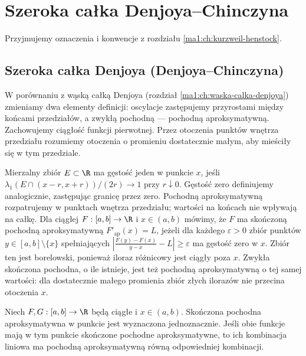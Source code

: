 \chapter{Szeroka całka Denjoya--Chinczyna}
\providecommand{\atlasref}[2]{#2}
\label{ma1:ch:szeroka-calka-denjoya}
\begingroup
\providecommand{\osc}{\operatorname{osc}}
\providecommand{\Var}{\operatorname{Var}}
\providecommand{\mesh}{\operatorname{mesh}}
\providecommand{\supp}{\operatorname{supp}}
\providecommand{\AC}{\mathrm{AC}}
\providecommand{\BV}{\mathrm{BV}}
\providecommand{\HK}{\mathrm{KH}}
\providecommand{\ind}[1]{\chi_{#1}}
\providecommand{\Dn}{\underline D}
\providecommand{\Du}{\overline D}
\providecommand{\KS}{\mathrm{KS}}
Przyjmujemy oznaczenia i konwencje z rozdziału \ref{ma1:ch:kurzweil-henstock}.
\section{Szeroka całka Denjoya (Denjoya--Chinczyna)}
W porównaniu z wąską całką Denjoya (rozdział
\ref{ma1:ch:waska-calka-denjoya}) zmieniamy dwa elementy
definicji: oscylacje zastępujemy przyrostami między
końcami przedziałów, a zwykłą pochodną --- pochodną
aproksymatywną. Zachowujemy ciągłość funkcji pierwotnej.
Przez otoczenia punktów wnętrza przedziału rozumiemy
otoczenia o promieniu dostatecznie małym, aby mieściły
się w tym przedziale.
\begin{definicja}\label{it:def:approx-derivative}
Mierzalny zbiór $E\subset\R$ ma gęstość jeden w punkcie $x$, jeśli $\lambda_1(E\cap(x-r,x+r))/(2r)\to1$ przy $r\downarrow0$. Gęstość zero definiujemy analogicznie, zastępując granicę przez zero. Pochodną aproksymatywną rozpatrujemy w punktach wnętrza przedziału; wartości na końcach nie wpływają na całkę. Dla ciągłej $F:[a,b]\to\R$ i $x\in(a,b)$ mówimy, że $F$ ma skończoną pochodną aproksymatywną $F'_{\mathrm{ap}}(x)=L$, jeżeli dla każdego $\varepsilon>0$ zbiór punktów $y\in[a,b]\setminus\{x\}$ spełniających
$\left|\frac{F(y)-F(x)}{y-x}-L\right|\ge\varepsilon$ ma gęstość zero w $x$. Zbiór ten jest borelowski, ponieważ iloraz różnicowy jest ciągły poza $x$. Zwykła skończona pochodna, o ile istnieje, jest też pochodną aproksymatywną o tej samej wartości: dla dostatecznie małego promienia zbiór złych ilorazów nie przecina otoczenia $x$.
\end{definicja}
\begin{lemat}\label{it:lem:approx-derivative}
Niech $F,G:[a,b]\to\R$ będą ciągłe i $x\in(a,b)$. Skończona pochodna aproksymatywna w punkcie jest wyznaczona jednoznacznie. Jeśli obie funkcje mają w tym punkcie skończone pochodne aproksymatywne, to ich kombinacja liniowa ma pochodną aproksymatywną równą odpowiedniej kombinacji.
\end{lemat}
